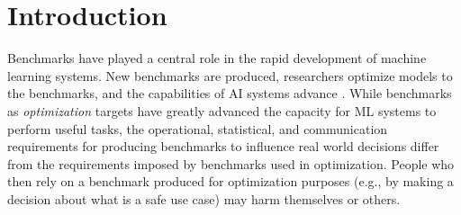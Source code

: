 \documentclass{article}
\begin{document}




\section{Introduction}
Benchmarks have played a central role in the rapid development of machine learning systems. New benchmarks are produced, researchers optimize models to the benchmarks, and the capabilities of AI systems advance \cite{deng2009,srivastava2022}. While benchmarks as \textit{optimization} targets have greatly advanced the capacity for ML systems to perform useful tasks, the operational, statistical, and communication requirements for producing benchmarks to influence real world decisions differ from the requirements imposed by benchmarks used in optimization. People who then rely on a benchmark produced for optimization purposes (e.g., by making a decision about what is a safe use case) may harm themselves or others.
\end{document}
